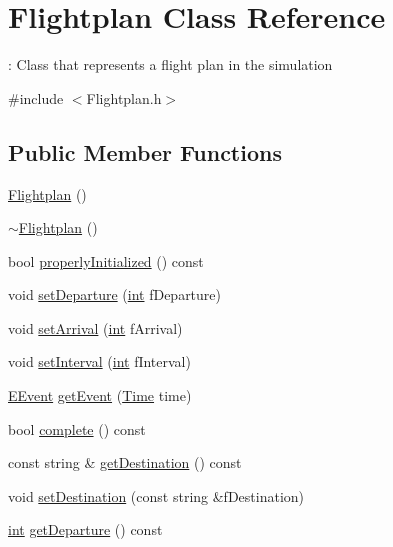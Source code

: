 \hypertarget{classFlightplan}{}\section{Flightplan Class Reference}
\label{classFlightplan}


\+: Class that represents a flight plan in the simulation  




{\ttfamily \#include $<$Flightplan.\+h$>$}

\subsection*{Public Member Functions}
\begin{DoxyCompactItemize}
\item 
\hyperlink{classFlightplan_ac2382ffda13572e5f7434d887c05f2f5}{Flightplan} ()
\item 
\hyperlink{classFlightplan_af94db993571dde1fa3da8fc4f733ed8d}{$\sim$\+Flightplan} ()
\item 
bool \hyperlink{classFlightplan_a5b5f371dc8451e95a981ec4e01f348a0}{properly\+Initialized} () const 
\item 
void \hyperlink{classFlightplan_a46d9b61f11e05ee917423b30018eb311}{set\+Departure} (\hyperlink{CMakeCache_8txt_a79a3d8790b2588b09777910863574e09}{int} f\+Departure)
\item 
void \hyperlink{classFlightplan_aa418664239c83960df069cdfb456e819}{set\+Arrival} (\hyperlink{CMakeCache_8txt_a79a3d8790b2588b09777910863574e09}{int} f\+Arrival)
\item 
void \hyperlink{classFlightplan_a7a253899d4a09a629bf88f5184f6f7a3}{set\+Interval} (\hyperlink{CMakeCache_8txt_a79a3d8790b2588b09777910863574e09}{int} f\+Interval)
\item 
\hyperlink{Flightplan_8h_ab41c9a082b57fd41aefb64a57d8149f8}{E\+Event} \hyperlink{classFlightplan_a2b7410b0bcabb84db2164b4163dfddb4}{get\+Event} (\hyperlink{classTime}{Time} time)
\item 
bool \hyperlink{classFlightplan_a07f564cb5e5cdbad4abb2098f7941597}{complete} () const 
\item 
const string \& \hyperlink{classFlightplan_aa625d49c014955ff1e62668a297dd0a0}{get\+Destination} () const 
\item 
void \hyperlink{classFlightplan_a9d345a0fbf7a000075cd8bac019e1827}{set\+Destination} (const string \&f\+Destination)
\item 
\hyperlink{CMakeCache_8txt_a79a3d8790b2588b09777910863574e09}{int} \hyperlink{classFlightplan_a2453c9cf22ec82997787a60088f71c67}{get\+Departure} () const 

\end{DoxyCompactItemize}
